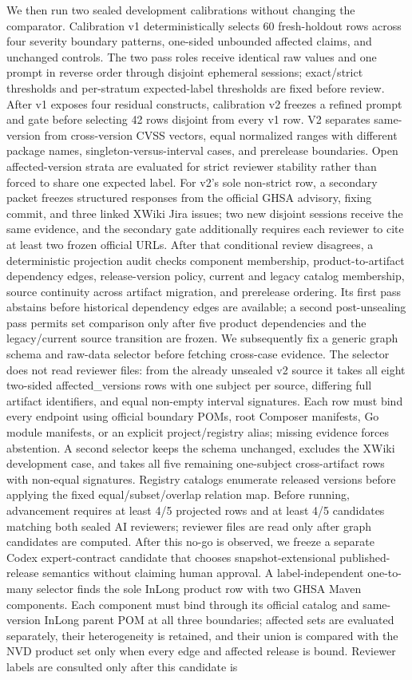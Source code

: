 We then run two sealed development calibrations without changing the comparator. Calibration v1 deterministically selects 60 fresh-holdout rows across four severity boundary patterns, one-sided unbounded affected claims, and unchanged controls. The two pass roles receive identical raw values and one prompt in reverse order through disjoint ephemeral sessions; exact/strict thresholds and per-stratum expected-label thresholds are fixed before review. After v1 exposes four residual constructs, calibration v2 freezes a refined prompt and gate before selecting 42 rows disjoint from every v1 row. V2 separates same-version from cross-version CVSS vectors, equal normalized ranges with different package names, singleton-versus-interval cases, and prerelease boundaries. Open affected-version strata are evaluated for strict reviewer stability rather than forced to share one expected label. For v2's sole non-strict row, a secondary packet freezes structured responses from the official GHSA advisory, fixing commit, and three linked XWiki Jira issues; two new disjoint sessions receive the same evidence, and the secondary gate additionally requires each reviewer to cite at least two frozen official URLs. After that conditional review disagrees, a deterministic projection audit checks component membership, product-to-artifact dependency edges, release-version policy, current and legacy catalog membership, source continuity across artifact migration, and prerelease ordering. Its first pass abstains before historical dependency edges are available; a second post-unsealing pass permits set comparison only after five product dependencies and the legacy/current source transition are frozen. We subsequently fix a generic graph schema and raw-data selector before fetching cross-case evidence. The selector does not read reviewer files: from the already unsealed v2 source it takes all eight two-sided affected\_versions rows with one subject per source, differing full artifact identifiers, and equal non-empty interval signatures. Each row must bind every endpoint using official boundary POMs, root Composer manifests, Go module manifests, or an explicit project/registry alias; missing evidence forces abstention. A second selector keeps the schema unchanged, excludes the XWiki development case, and takes all five remaining one-subject cross-artifact rows with non-equal signatures. Registry catalogs enumerate released versions before applying the fixed equal/subset/overlap relation map. Before running, advancement requires at least 4/5 projected rows and at least 4/5 candidates matching both sealed AI reviewers; reviewer files are read only after graph candidates are computed. After this no-go is observed, we freeze a separate Codex expert-contract candidate that chooses snapshot-extensional published-release semantics without claiming human approval. A label-independent one-to-many selector finds the sole InLong product row with two GHSA Maven components. Each component must bind through its official catalog and same-version InLong parent POM at all three boundaries; affected sets are evaluated separately, their heterogeneity is retained, and their union is compared with the NVD product set only when every edge and affected release is bound. Reviewer labels are consulted only after this candidate is 